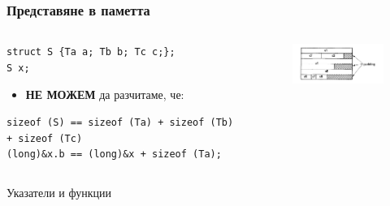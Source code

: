 \documentclass{beamer}
\begin{document}
\begin{frame}[fragile]
\frametitle{Представяне в паметта} 


\begin{columns}[t]
  \begin{column}{0.7\textwidth}
  
  \begin{flushleft}
  
  
\begin{lstlisting}
struct S {Ta a; Tb b; Tc c;};
S x;
\end{lstlisting}
   \end {flushleft}

\begin{itemize}
\item \textbf{НЕ МОЖЕМ} да разчитаме, че:
\end{itemize}

\begin{flushleft}
\begin{lstlisting}
sizeof (S) == sizeof (Ta) + sizeof (Tb) + sizeof (Tc)
(long)&x.b == (long)&x + sizeof (Ta);
\end{lstlisting}
\end{flushleft}

  \end{column}
  \begin{column}{0.3\textwidth}
\begin{figure}
\includegraphics[width=4.5cm]{images/padding}
\end{figure}

  \end{column}
\end{columns}


\end{frame}


\begin{frame}
\centerline{Указатели и функции}
\end{frame}
\end{document}
